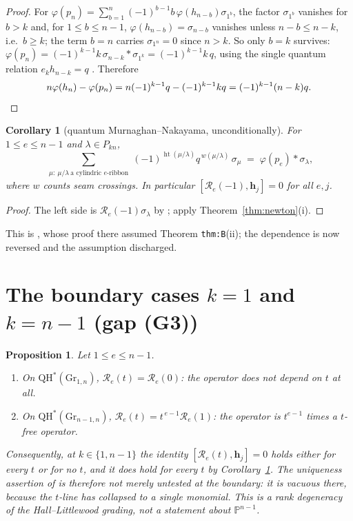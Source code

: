 \documentclass[11pt]{article}
\theoremstyle{plain}
\newtheorem{proposition}[theorem]{Proposition}
\newtheorem{corollary}[theorem]{Corollary}
\theoremstyle{definition}
\newcommand{\QH}{\mathrm{QH}^*}
\newcommand{\Gr}{\mathrm{Gr}}
\newcommand{\bh}{\mathbf h}
\DeclareMathOperator{\hgt}{ht}
\begin{document}
\begin{proof}
For $\varphi(p_n)=\sum_{b=1}^{n}(-1)^{b-1}b\,\varphi(h_{n-b})\sigma_{1^b}$, the
factor $\sigma_{1^b}$ vanishes for $b>k$ and, for $1\le b\le n-1$,
$\varphi(h_{n-b})=\sigma_{n-b}$ vanishes unless $n-b\le n-k$, i.e.\ $b\ge k$;
the term $b=n$ carries $\sigma_{1^n}=0$ since $n>k$.  So only $b=k$ survives:
$\varphi(p_n)=(-1)^{k-1}k\,\sigma_{n-k}*\sigma_{1^k}=(-1)^{k-1}k\,q$, using the
single quantum relation $e_kh_{n-k}=q$ \cite[\texttt{thm:C}(ii)]{Clio201}.  Therefore
\[
n\varphi(h_n)-\varphi(p_n)=n(-1)^{k-1}q-(-1)^{k-1}kq=(-1)^{k-1}(n-k)q. \qedhere
\]
\end{proof}

\begin{corollary}[quantum Murnaghan--Nakayama, unconditionally]\label{cor:MN}
For $1\le e\le n-1$ and $\lambda\in P_{kn}$,
\[
\sum_{\substack{\mu:\ \mu/\lambda\ \text{a cylindric }e\text{-ribbon}}}
(-1)^{\hgt(\mu/\lambda)}q^{\,w(\mu/\lambda)}\,\sigma_\mu
\;=\;\varphi(p_e)*\sigma_\lambda ,
\]
where $w$ counts seam crossings.  In particular
$[\mathcal R_e(-1),\bh_j]=0$ for all $e,j$.
\end{corollary}

\begin{proof}
The left side is $\mathcal R_e(-1)\sigma_\lambda$ by
\cite[\texttt{eq:ribbondef} and \texttt{thm:A}]{Clio201}; apply Theorem~\ref{thm:newton}(i).
\end{proof}

\noindent
This is \cite[\texttt{prop:MN}]{Clio201}, whose proof there assumed
Theorem \texttt{thm:B}(ii); the dependence is now reversed and the assumption
discharged.

\section{The boundary cases $k=1$ and $k=n-1$ (gap (G3))}

\begin{proposition}\label{prop:G3}
Let $1\le e\le n-1$.
\begin{enumerate}
\item[(a)] On $\QH(\Gr_{1,n})$, $\mathcal R_e(t)=\mathcal R_e(0)$: the operator
  does not depend on $t$ at all.
\item[(b)] On $\QH(\Gr_{n-1,n})$, $\mathcal R_e(t)=t^{\,e-1}\mathcal R_e(1)$:
  the operator is $t^{e-1}$ times a $t$-free operator.
\end{enumerate}
Consequently, at $k\in\{1,n-1\}$ the identity $[\mathcal R_e(t),\bh_j]=0$ holds
either for every $t$ or for no $t$, and it does hold for every $t$ by
Corollary~\ref{cor:MN}.  The uniqueness assertion of
\cite[\texttt{thm:B}(i)]{Clio201} is therefore not merely untested at the boundary: it
is \emph{vacuous} there, because the $t$-line has collapsed to a single
monomial.  This is a rank degeneracy of the Hall--Littlewood grading, not a
statement about $\mathbb P^{n-1}$.
\end{proposition}
\end{document}
